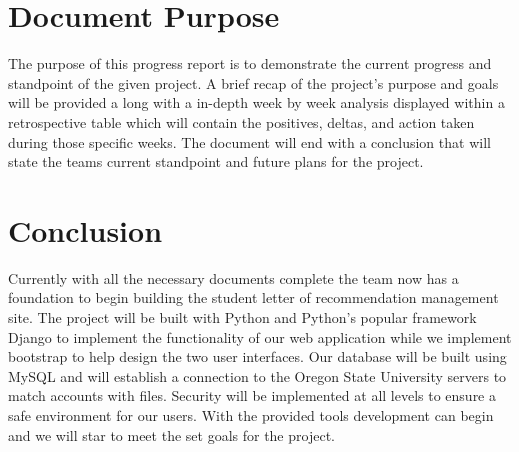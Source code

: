 \documentclass[onecolumn, draftclsnofoot,10pt, compsoc]{IEEEtran}
\begin{document}
\newpage
{}
\tableofcontents
\clearpage

\section{Document Purpose}
The purpose of this progress report is to demonstrate the current progress and standpoint of the given project. A brief recap of the project's purpose and goals will be provided a long with a in-depth week by week analysis displayed within a retrospective table which will contain the positives, deltas, and action taken during those specific weeks. The document will end with a conclusion that will state the teams current standpoint and future plans for the project. 

\section{Conclusion}
Currently with all the necessary documents complete the team now has a foundation to begin building the student letter of recommendation management site. The project will be built with Python and Python's popular framework Django to implement the functionality of our web application while we implement bootstrap to help design the two user interfaces. Our database will be built using MySQL and will establish a connection to the Oregon State University servers to match accounts with files. Security will be implemented at all levels to ensure a safe environment for our users. With the provided tools development can begin and we will star to meet the set goals for the project. 
\end{document}
